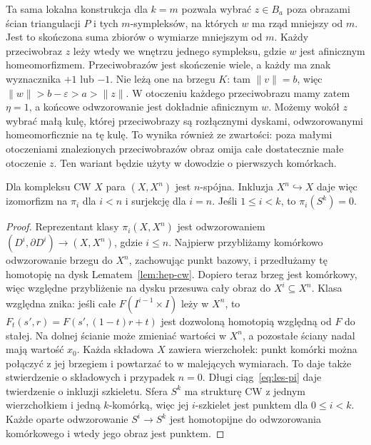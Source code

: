 \begin{uwaga}
\label{rem:przyblizenie-rowne-wymiary}
Ta sama lokalna konstrukcja dla $k=m$ pozwala wybrać $z\in B_a$
poza obrazami ścian triangulacji $P$ i tych $m$-sympleksów,
na których $w$ ma rząd mniejszy od $m$. Jest to skończona suma
zbiorów o wymiarze mniejszym od $m$. Każdy przeciwobraz $z$
leży wtedy we wnętrzu jednego sympleksu, gdzie $w$ jest afinicznym homeomorfizmem.
Przeciwobrazów jest skończenie wiele, a każdy ma znak wyznacznika $+1$ lub $-1$.
Nie leżą one na brzegu $K$: tam $\|v\|=b$, więc
$\|w\|>b-\varepsilon>a>\|z\|$.
W otoczeniu każdego przeciwobrazu mamy zatem $\eta=1$,
a końcowe odwzorowanie jest dokładnie afinicznym $w$.
Możemy wokół $z$ wybrać małą kulę, której przeciwobrazy są rozłącznymi
dyskami, odwzorowanymi homeomorficznie na tę kulę.
To wynika również ze zwartości: poza małymi otoczeniami znalezionych
przeciwobrazów obraz omija całe dostatecznie małe otoczenie $z$.
Ten wariant będzie użyty w dowodzie o pierwszych komórkach.
\end{uwaga}

\begin{wniosek}
\label{cor:pi-szkielety}
Dla kompleksu CW $X$ para
$(X,X^n)$ jest $n$-spójna.
Inkluzja $X^n\hookrightarrow X$
daje więc izomorfizm na
$\pi_i$ dla $i<n$
i surjekcję dla $i=n$.
Jeśli $1\leq i<k$, to
$\pi_i(S^k)=0$.
\end{wniosek}
\begin{proof}
Reprezentant klasy
$\pi_i(X,X^n)$ jest
odwzorowaniem $(D^i,\partial D^i)\to
(X,X^n)$, gdzie $i\leq n$.
Najpierw przybliżamy komórkowo odwzorowanie brzegu do $X^n$,
zachowując punkt bazowy, i przedłużamy tę homotopię na dysk
Lematem~\ref{lem:hep-cw}. Dopiero teraz brzeg jest komórkowy,
więc względne przybliżenie na dysku przesuwa cały obraz do
$X^i\subseteq X^n$. Klasa względna znika: jeśli całe
$F(I^{i-1}\times I)$ leży w $X^n$, to
$F_t(s',r)=F(s',(1-t)r+t)$ jest dozwoloną homotopią
względną od $F$ do stałej. Na dolnej ścianie może zmieniać wartości
w $X^n$, a pozostałe ściany nadal mają wartość $x_0$.
Każda składowa $X$ zawiera wierzchołek: punkt komórki można
połączyć z jej brzegiem i powtarzać to w malejących wymiarach.
To daje także stwierdzenie o składowych i przypadek $n=0$.
Długi ciąg~\eqref{eq:les-pi}
daje twierdzenie o
inkluzji szkieletu.
Sfera $S^k$ ma strukturę CW
z jednym wierzchołkiem
i jedną $k$-komórką,
więc jej $i$-szkielet
jest punktem dla $0\leq i<k$.
Każde oparte odwzorowanie
$S^i\to S^k$ jest
homotopijne do odwzorowania
komórkowego i wtedy
jego obraz jest punktem.
\end{proof}

